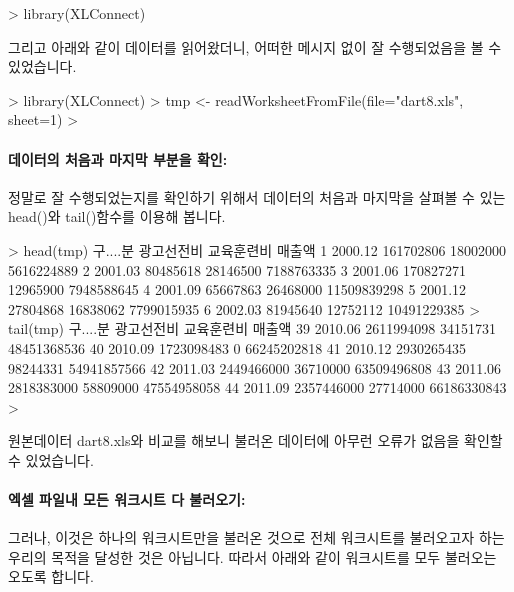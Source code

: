 \begin{Schunk}
\begin{Soutput}
> library(XLConnect)
\end{Soutput}
\end{Schunk}

그리고 아래와 같이 데이터를 읽어왔더니, 어떠한 메시지 없이 잘 수행되었음을 볼 수 있었습니다. 

\begin{Schunk}
\begin{Soutput}
> library(XLConnect)
> tmp <- readWorksheetFromFile(file="dart8.xls", sheet=1)
> 
\end{Soutput}
\end{Schunk}

\paragraph{데이터의 처음과 마지막 부분을 확인:} 
정말로 잘 수행되었는지를 확인하기 위해서 데이터의 처음과 마지막을 살펴볼 수 있는 head()와 tail()함수를 이용해 봅니다.

\begin{Schunk}
\begin{Soutput}
> head(tmp)
  구....분 광고선전비 교육훈련비      매출액
1  2000.12  161702806   18002000  5616224889
2  2001.03   80485618   28146500  7188763335
3  2001.06  170827271   12965900  7948588645
4  2001.09   65667863   26468000 11509839298
5  2001.12   27804868   16838062  7799015935
6  2002.03   81945640   12752112 10491229385
> tail(tmp)
   구....분 광고선전비 교육훈련비      매출액
39  2010.06 2611994098   34151731 48451368536
40  2010.09 1723098483          0 66245202818
41  2010.12 2930265435   98244331 54941857566
42  2011.03 2449466000   36710000 63509496808
43  2011.06 2818383000   58809000 47554958058
44  2011.09 2357446000   27714000 66186330843
> 
\end{Soutput}
\end{Schunk}

원본데이터 dart8.xls와 비교를 해보니 불러온 데이터에 아무런 오류가 없음을 확인할 수 있었습니다.


\paragraph{엑셀 파일내 모든 워크시트 다 불러오기:} 
그러나, 이것은 하나의 워크시트만을 불러온 것으로 전체 워크시트를 불러오고자 하는 우리의 목적을 달성한 것은 아닙니다.
따라서 아래와 같이 워크시트를 모두 불러오는 오도록 합니다.

